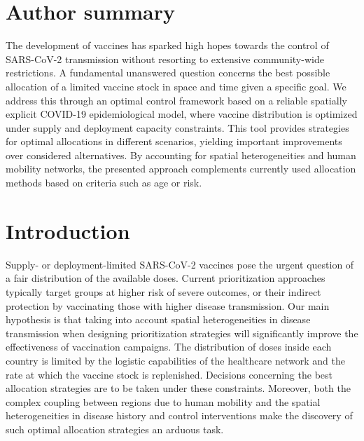 \section{Author summary}
The development of vaccines has sparked high hopes towards the control of SARS-CoV-2 transmission without resorting to extensive community-wide restrictions. A fundamental unanswered question concerns the best possible allocation of a limited vaccine stock in space and time given a specific goal. We address this through an optimal control framework based on a reliable spatially explicit COVID-19 epidemiological model, where vaccine distribution is optimized under supply and deployment capacity constraints. This tool provides strategies for optimal allocations in different scenarios, yielding important improvements over considered alternatives. By accounting for spatial heterogeneities and human mobility networks, the presented approach complements currently used allocation methods based on criteria such as age or risk.


\section{Introduction}
Supply- or deployment-limited SARS-CoV-2 vaccines\cite{Khamsi:IfCoronavirusVaccine:2020} pose the urgent question of a fair distribution of the available doses\cite{NationalAcademiesofSciencesEngineeringandMedicine:FrameworkEquitableAllocation:2020}. Current prioritization approaches typically target groups at higher risk of severe outcomes\cite{Spassiani:VaccinationCriteriaBased:2020, Matrajt:VaccineOptimizationCOVID19:2020a}, or their indirect protection by vaccinating those with higher disease transmission\cite{Spassiani:VaccinationCriteriaBased:2020,Gallagher:IndirectBenefitsAre:2021,Tuite:AlternativeDoseAllocation:2021}. Our main hypothesis is that taking into account spatial heterogeneities in disease transmission when designing prioritization strategies will significantly improve the effectiveness of vaccination campaigns.
The distribution of doses inside each country is limited by the logistic capabilities of the healthcare network and the rate at which the vaccine stock is replenished. Decisions concerning the best allocation strategies are to be taken under these constraints. Moreover, both the complex coupling between regions due to human mobility and the spatial heterogeneities in disease history and control interventions make the discovery of such optimal allocation strategies an arduous task.


